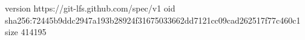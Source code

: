 version https://git-lfs.github.com/spec/v1
oid sha256:72445b9ddc2947a193b28924f31675033662dd7121cc09cad262517f77c460c1
size 414195
